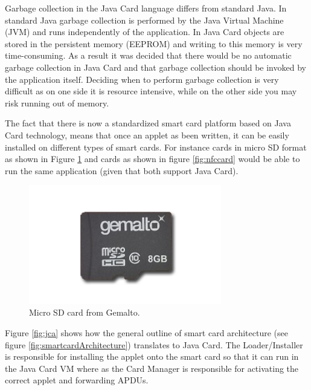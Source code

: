 Garbage collection in the Java Card language differs from standard Java. In standard Java garbage collection is performed by the Java Virtual Machine (JVM) and runs independently of the application. In Java Card objects are stored in the persistent memory (EEPROM) and writing to this memory is very time-consuming. As a result it was decided that there would be no automatic garbage collection in Java Card and that garbage collection should be invoked by the application itself. Deciding when to perform garbage collection is very difficult as on one side it is resource intensive, while on the other side you may risk running out of memory.

The fact that there is now a standardized smart card platform based on Java Card technology, means that once an applet as been written, it can be easily installed on different types of smart cards. For instance cards in micro SD format as shown in Figure \ref{fig:msdcard} and cards as shown in figure \ref{fig:nfccard} would be able to run the same application (given that both support Java Card).


\begin{figure}[h!]
  \caption{Micro SD card from Gemalto.}
  \label{fig:msdcard}
  \centering
    \includegraphics[width=0.75\textwidth]{images/msd.png}
\end{figure}

Figure \ref{fig:jca} shows how the general outline of smart card architecture (see figure \ref{fig:smartcardArchitecture}) translates to Java Card. The Loader/Installer is responsible for installing the applet onto the smart card so that it can run in the Java Card VM where as the Card Manager is responsible for activating the correct applet and forwarding APDUs.

